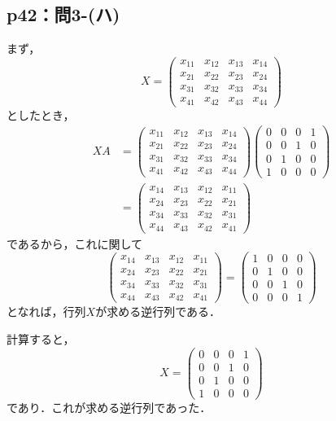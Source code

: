 \documentclass[a4paper,10pt,fleqn]{ltjsarticle}
\begin{document}
\subsection*{p42：問3-(ハ)}

\begin{tleftbar}
    まず，
    \[
        X= \begin{pmatrix} x_{11} & x_{12} & x_{13} & x_{14}\\x_{21} & x_{22} & x_{23} & x_{24} \\x_{31} & x_{32} & x_{33} & x_{34} \\x_{41} & x_{42} & x_{43} & x_{44} \end{pmatrix}
    \]
    としたとき，
    \begin{align*}
        XA & = \begin{pmatrix} x_{11} & x_{12} & x_{13} & x_{14}\\x_{21} & x_{22} & x_{23} & x_{24} \\x_{31} & x_{32} & x_{33} & x_{34} \\x_{41} & x_{42} & x_{43} & x_{44} \end{pmatrix}
        \begin{pmatrix} 0 & 0 & 0 & 1 \\ 0 & 0 & 1 & 0 \\ 0 & 1 & 0 & 0 \\ 1 & 0 & 0 & 0 \end{pmatrix}                                                                                     \\
           & = \begin{pmatrix} x_{14} & x_{13} & x_{12} & x_{11} \\x_{24} & x_{23} & x_{22} & x_{21} \\x_{34} & x_{33} & x_{32} & x_{31} \\x_{44} & x_{43} & x_{42} & x_{41} \end{pmatrix}
    \end{align*}
    であるから，これに関して
    \[
        \begin{pmatrix} x_{14} & x_{13} & x_{12} & x_{11} \\x_{24} & x_{23} & x_{22} & x_{21} \\x_{34} & x_{33} & x_{32} & x_{31} \\x_{44} & x_{43} & x_{42} & x_{41} \end{pmatrix} = \begin{pmatrix} 1 & 0 & 0 & 0 \\ 0 & 1 & 0 & 0 \\ 0 & 0 & 1 & 0 \\ 0 & 0 & 0 & 1 \end{pmatrix}
    \]
    となれば，行列$X$が求める逆行列である．

    計算すると，
    \[
        X = \begin{pmatrix} 0 & 0 & 0 & 1 \\ 0 & 0 & 1 & 0 \\ 0 & 1 & 0 & 0 \\ 1 & 0 & 0 & 0 \end{pmatrix}
    \]
    であり．これが求める逆行列であった．
\end{tleftbar}
\end{document}
